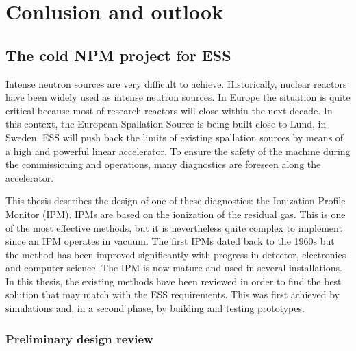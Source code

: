 \chapter{Conlusion and outlook}
\cleardoublepage

\minitoc
\section*{The cold NPM project for ESS}
Intense neutron sources are very difficult to achieve. Historically, nuclear reactors have been widely used as intense neutron sources. In Europe the situation is quite critical because most of research reactors will close within the next decade. In this context, the European Spallation Source is being built close to Lund, in Sweden. ESS will push back the limits of existing spallation sources by means of a high and powerful linear accelerator. To ensure the safety of the machine during the commissioning and operations, many diagnostics are foreseen along the accelerator.

This thesis describes the design of one of these diagnostics: the Ionization Profile Monitor (IPM). IPMs are based on the ionization of the residual gas. This is one of the most effective methods, but it is nevertheless quite complex to implement since an IPM operates in vacuum. The first IPMs dated back to the 1960s but the method has been improved significantly with progress in detector, electronics and computer science. The IPM is now mature and used in several installations. In this thesis, the existing methods have been reviewed in order to find the best solution that may match with the ESS requirements. This was first achieved by simulations and, in a second phase, by building and testing prototypes.

\subsection*{Preliminary design review}

